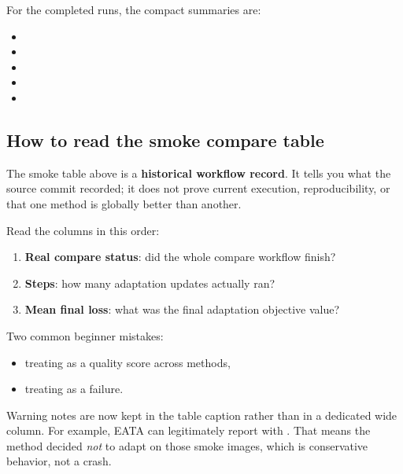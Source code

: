 For the completed runs, the compact summaries are:
\begin{itemize}
  \item {}
  \item {}
  \item {}
  \item {}
  \item {}
\end{itemize}

\subsection{How to read the smoke compare table}
The smoke table above is a \textbf{historical workflow record}. It tells you
what the source commit recorded; it does not prove current execution,
reproducibility, or that one method is globally better than another.

Read the columns in this order:
\begin{enumerate}
  \item \textbf{Real compare status}: did the whole compare workflow finish?
  \item \textbf{Steps}: how many adaptation updates actually ran?
  \item \textbf{Mean final loss}: what was the final adaptation objective value?
\end{enumerate}

Two common beginner mistakes:
\begin{itemize}
  \item treating  as a quality score across methods,
  \item treating  as a failure.
\end{itemize}
Warning notes are now kept in the table caption rather than in a dedicated wide column.
For example, EATA can legitimately report  with
. That means the method decided \emph{not} to adapt on those smoke images, which is conservative behavior, not a crash.

